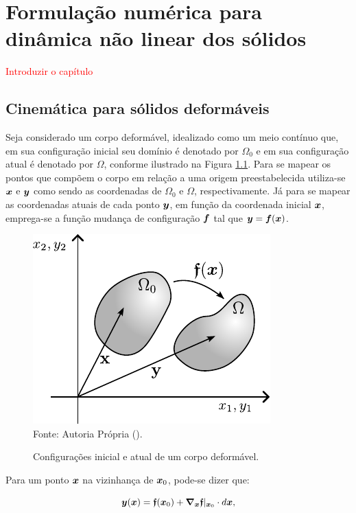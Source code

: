 \chapter{Formulação numérica para dinâmica não linear dos sólidos} \label{EGDS}

\textcolor{red}{Introduzir o capítulo}

\section{Cinemática para sólidos deformáveis}

Seja considerado um corpo deformável, idealizado como um meio contínuo que, em sua configuração inicial seu domínio é denotado por $\Omega_0$ e em sua configuração atual é denotado por $\Omega$, conforme ilustrado na Figura \ref{fig:Cont}. Para se mapear os pontos que compõem o corpo em relação a uma origem preestabelecida utiliza-se $\boldsymbol{x}$ e $\boldsymbol{y}$ como sendo as coordenadas de $\Omega_0$ e $\Omega$, respectivamente. Já para se mapear as coordenadas atuais de cada ponto $\boldsymbol{y}$, em função da coordenada inicial $\boldsymbol{x}$, emprega-se a função mudança de configuração $\boldsymbol{f}$ tal que $\boldsymbol{y}=\boldsymbol{f}(\boldsymbol{x})$.

\begin{figure}[h!]
    \centering
    \caption{Configurações inicial e atual de um corpo deformável.}
    \includegraphics[width=.4\linewidth]{Figuras/Cont.pdf}
    \\Fonte: Autoria Própria (\the\year).
    \label{fig:Cont}
\end{figure}

Para um ponto $\boldsymbol{x}$ na vizinhança de $\boldsymbol{x}_0$, pode-se dizer que:

\begin{equation}
    \boldsymbol{y}(\boldsymbol{x})=\boldsymbol{\mathfrak{f}}(\boldsymbol{x}_0)+\boldsymbol{\nabla_x}\boldsymbol{\mathfrak{f}}|_{\boldsymbol{x}_0}\cdot d\boldsymbol{x}\text{,}
\end{equation}

